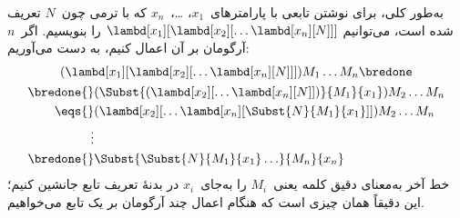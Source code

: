 \documentclass[../../../include/open-logic-section]{subfiles}
\begin{document}
به‌طور کلی، برای نوشتن تابعی با پارامترهای~$x_1$، \dots،~$x_n$ که با
ترمی چون~$N$ تعریف شده است، می‌توانیم
$\lambd[x_1][\lambd[x_2][\ldots\lambd[x_n][N]]]$ را بنویسیم. اگر~$n$
آرگومان بر آن اعمال کنیم، به دست می‌آوریم:
\begin{multline*}
  (\lambd[x_1][\lambd[x_2][\ldots\lambd[x_n][N]]]) M_1 \dots M_n \bredone\\
  \begin{aligned}
  \bredone {} & (\Subst{(\lambd[x_2][\ldots\lambd[x_n][N]])}{M_1}{x_1}) M_2
  \dots M_n\\
   \eqs {} & (\lambd[x_2][\ldots\lambd[x_n][\Subst{N}{M_1}{x_1}]]) M_2
            \dots M_n \\
  \vdots & \\
  \bredone {} &\Subst{\Subst{N}{M_1}{x_1}\ldots}{M_n}{x_n}
  \end{aligned}
\end{multline*}
خط آخر به‌معنای دقیق کلمه یعنی~$M_i$ را به‌جای~$x_i$ در بدنهٔ تعریف
تابع جانشین کنیم؛ این دقیقاً همان چیزی است که هنگام اعمال چند آرگومان
بر یک تابع می‌خواهیم.
\end{document}
